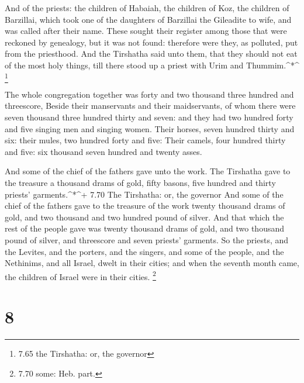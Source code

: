  And of the priests: the children of Habaiah, the children
of Koz, the children of Barzillai, which took one of the daughters of
Barzillai the Gileadite to wife, and was called after their name.
 These sought their register among those that were reckoned
by genealogy, but it was not found: therefore were they, as polluted,
put from the priesthood.  And the Tirshatha said unto them,
that they should not eat of the most holy things, till there stood up a
priest with Urim and Thummim.\^{}*\^{} \footnote{7.65 the Tirshatha: or,
  the governor}

 The whole congregation together was forty and two thousand
three hundred and threescore,  Beside their manservants and
their maidservants, of whom there were seven thousand three hundred
thirty and seven: and they had two hundred forty and five singing men
and singing women.  Their horses, seven hundred thirty and
six: their mules, two hundred forty and five:  Their
camels, four hundred thirty and five: six thousand seven hundred and
twenty asses.

 And some of the chief of the fathers gave unto the work.
The Tirshatha gave to the treasure a thousand drams of gold, fifty
basons, five hundred and thirty priests' garments.\^{}*\^{}+ 7.70 The
Tirshatha: or, the governor  And some of the chief of the
fathers gave to the treasure of the work twenty thousand drams of gold,
and two thousand and two hundred pound of silver.  And that
which the rest of the people gave was twenty thousand drams of gold, and
two thousand pound of silver, and threescore and seven priests'
garments.  So the priests, and the Levites, and the
porters, and the singers, and some of the people, and the Nethinims, and
all Israel, dwelt in their cities; and when the seventh month came, the
children of Israel were in their cities. \footnote{7.70 some: Heb. part.}

\hypertarget{section-7}{%
\section{8}\label{section-7}}

